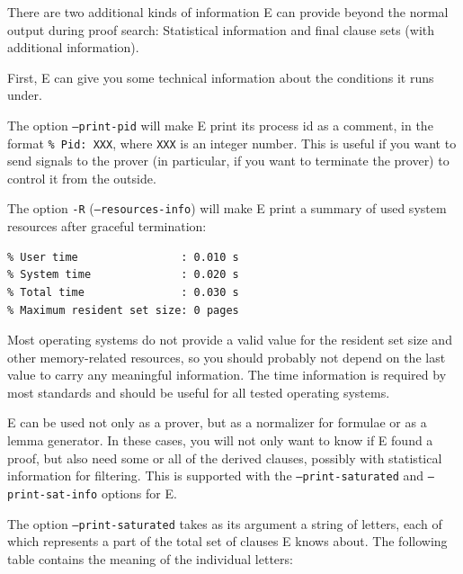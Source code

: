 \documentclass{report}
\begin{document}
There are two additional kinds of information E can provide beyond the
normal output during proof search: Statistical information and final
clause sets (with additional information).

First, E can give you some technical information about the conditions
it runs under.

The option \texttt{--print-pid} will make E print its process id as a
comment, in the format \texttt{\% Pid: XXX}, where \texttt{XXX} is an
integer number. This is useful if you want to send signals to the
prover (in particular, if you want to terminate the prover) to control
it from the outside.

The option \texttt{-R} (\texttt{--resources-info}) will make E print a
summary of used system resources after graceful termination:

\begin{verbatim}
% User time                : 0.010 s
% System time              : 0.020 s
% Total time               : 0.030 s
% Maximum resident set size: 0 pages
\end{verbatim}

Most operating systems do not provide a valid value for the resident
set size and other memory-related resources, so you should probably
not depend on the last value to carry any meaningful information. The
time information is required by most standards and should be useful
for all tested operating systems.

E can be used not only as a prover, but as a normalizer for formulae
or as a lemma generator. In these cases, you will not only want to know
if E found a proof, but also need some or all of the derived clauses,
possibly with statistical information for filtering. This is supported
with the \texttt{--print-saturated} and \texttt{--print-sat-info}
options for E.

The option \texttt{--print-saturated} takes as its argument a string
of letters, each of which represents a part of the total set of
clauses E knows about. The following table contains the meaning of the
individual letters:
\end{document}
